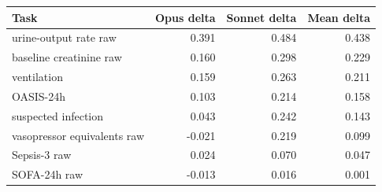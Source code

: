 \begin{tabular}{lrrr}
\toprule
Task & Opus delta & Sonnet delta & Mean delta \\
\midrule
urine-output rate raw & 0.391 & 0.484 & 0.438 \\
baseline creatinine raw & 0.160 & 0.298 & 0.229 \\
ventilation & 0.159 & 0.263 & 0.211 \\
OASIS-24h & 0.103 & 0.214 & 0.158 \\
suspected infection & 0.043 & 0.242 & 0.143 \\
vasopressor equivalents raw & -0.021 & 0.219 & 0.099 \\
Sepsis-3 raw & 0.024 & 0.070 & 0.047 \\
SOFA-24h raw & -0.013 & 0.016 & 0.001 \\
\bottomrule
\end{tabular}
